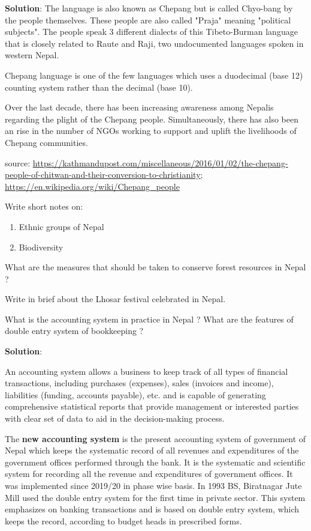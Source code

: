 \documentclass[
  openany]{book}
\newcommand{\question}{\item}
\newenvironment{solution}{ {\bfseries Solution}:}{}
\begin{document}
\begin{questions}
\begin{solution}
The language is also known as Chepang but is called Chyo-bang by the people themselves. These people are also called "Praja" meaning "political subjects". The people speak 3 different dialects of this Tibeto-Burman language that is closely related to Raute and Raji, two undocumented languages spoken in western Nepal.

Chepang language is one of the few languages which uses a duodecimal (base 12) counting system rather than the decimal (base 10). 

Over the last decade, there has been increasing awareness among Nepalis regarding the plight of the Chepang people. Simultaneously, there has also been an rise in the number of NGOs working to support and uplift the livelihoods of Chepang communities.


source: \url{https://kathmandupost.com/miscellaneous/2016/01/02/the-chepang-people-of-chitwan-and-their-conversion-to-christianity}; \url{https://en.wikipedia.org/wiki/Chepang_people}
\end{solution}

\question Write short notes on:

\begin{enumerate}[label=(\roman*)]
\item Ethnic groups of Nepal
\item Biodiversity
\end{enumerate}

\question What are the measures that should be taken to conserve forest resources in Nepal ?

\question Write in brief about the Lhosar festival celebrated in Nepal.

\question What is the accounting system in practice in Nepal ? What are the features of double entry system of bookkeeping ?

\begin{solution}

An accounting system allows a business to keep track of all types of financial transactions, including purchases (expenses), sales (invoices and income), liabilities (funding, accounts payable), etc. and is capable of generating comprehensive statistical reports that provide management or interested parties with clear set of data to aid in the decision-making process.

The \textbf{new accounting system} is the present accounting system of government of Nepal which keeps the systematic record of all revenues and expenditures of the government offices performed through the bank. It is the systematic and scientific system for recording all the revenue and expenditures of government offices. It was implemented since 2019/20 in phase wise basis. In 1993 BS, Biratnagar Jute Mill used the double entry system for the first time in private sector. This system emphasizes on banking transactions and is based on double entry system, which keeps the record, according to budget heads in prescribed forms.


\end{solution}
\end{questions}
\end{document}
